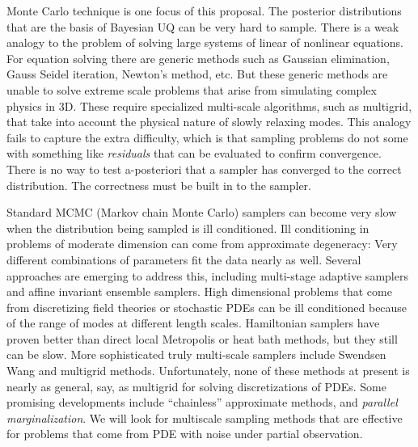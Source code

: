 \documentclass[11pt]{article}
\begin{document}
Monte Carlo technique is one focus of this proposal.
The posterior distributions that are the basis of Bayesian UQ can be very hard to sample.
There is a weak analogy to the problem of solving large systems of linear of nonlinear equations.
For equation solving there are generic methods such as Gaussian elimination, Gauss Seidel iteration,
Newton's method, etc.
But these generic methods are unable to solve extreme scale problems that arise from simulating
complex physics in 3D.
These require specialized multi-scale algorithms, such as multigrid, that take into account the
physical nature of slowly relaxing modes.
This analogy fails to capture the extra difficulty, which is that sampling problems do not some with
something like {\em residuals} that can be evaluated to confirm convergence.
There is no way to test a-posteriori that a sampler has converged to the correct distribution.
The correctness must be built in to the sampler.

Standard MCMC (Markov chain Monte Carlo) samplers can become very slow when the distribution being
sampled is ill conditioned.
Ill conditioning in problems of moderate dimension can come from approximate degeneracy: Very
different combinations of parameters fit the data nearly as well.
Several approaches are emerging to address this, including multi-stage adaptive samplers and
affine invariant ensemble samplers.
High dimensional problems that come from discretizing field theories or stochastic PDEs
can be ill conditioned because of the range of modes at different length scales.
Hamiltonian samplers have proven better than direct local Metropolis or heat bath methods, but
they still can be slow.
More sophisticated truly multi-scale samplers include Swendsen Wang and multigrid methods.
Unfortunately, none of these methods at present is nearly as general, say, as multigrid for
solving discretizations of PDEs.
Some promising developments include ``chainless'' approximate methods, and
{\em parallel marginalization}.
We will look for multiscale sampling methods that are effective for problems that come from PDE
with noise under partial observation.
\end{document}

